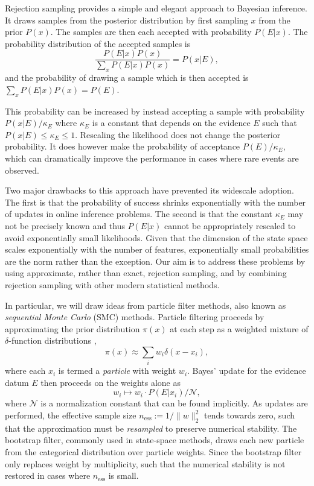 \documentclass[twoside]{article}
\newcommand{\ess}{\mathrm{ess}}
\newcommand{\defeq}{\mathrel{:=}}
\begin{document}
Rejection sampling provides a simple and elegant approach to Bayesian inference. 
It draws samples
from the posterior distribution by first sampling $x$ from the prior $P(x)$.
The samples are then each accepted with
probability $P(E|x)$.  The probability 
distribution of the accepted samples is 
\begin{equation}
  \frac{P(E|x)P(x)}{\sum_x P(E|x)P(x)}= P(x|E),
\end{equation}
and the probability of drawing a sample which is then accepted is $\sum_x P(E|x)P(x)=P(E)$.  

This probability
can be increased by instead accepting a sample with probability $P(x|E)/\kappa_E$ where
$\kappa_E$ is a constant that depends on the evidence $E$ such that $P(x|E) \le \kappa_E \le 1$.
Rescaling the likelihood does not change the posterior probability.
It does however make the probability of acceptance $P(E)/\kappa_E$, which
can dramatically improve the performance in cases where rare events are observed.

Two major drawbacks to this approach have prevented its widescale adoption.  The first is that the probability of success shrinks exponentially with the number of updates
in online inference problems.
The second  is that the constant $\kappa_E$ may not be precisely known and thus $P(E|x)$ cannot be appropriately rescaled to avoid exponentially small likelihoods.  Given that the dimension of the state
space scales exponentially with the number of features, exponentially small probabilities are the norm rather than the exception. 
Our aim is to address these problems
by using approximate, rather than exact, rejection sampling, and
by combining rejection sampling with other modern statistical methods.

In particular, we will draw ideas from particle filter methods, also known as \emph{sequential Monte Carlo} (SMC) methods. Particle filtering proceeds
by approximating the prior distribution $\pi(x)$ at each step as a weighted
mixture of $\delta$-function distributions \cite{doucet_introduction_2001},
\begin{equation}
    \pi(x) \approx \sum_i w_i \delta(x - x_i),
\end{equation}
where each $x_i$ is termed a \emph{particle} with weight $w_i$.
Bayes' update for the evidence datum $E$ then proceeds on the weights alone as
\begin{equation}
    w_i \mapsto w_i \cdot P(E | x_i) / \mathcal{N},
\end{equation}
where $\mathcal{N}$ is a normalization constant that can be found implicitly.
As updates are performed, the effective sample size $n_\ess \defeq
1 / \|w\|_2^2$ tends towards zero, such that the approximation must be
\emph{resampled} to preserve numerical stability. The bootstrap filter,
commonly used in state-space methods, draws each new particle from the categorical
distribution over particle weights. 
Since the bootstrap filter only replaces weight by multiplicity,
such that the numerical stability is not restored in cases where $n_\ess$ is small.
\end{document}
